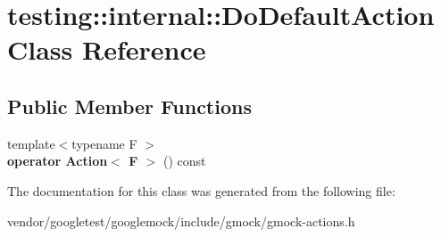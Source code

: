 \hypertarget{classtesting_1_1internal_1_1DoDefaultAction}{}\section{testing\+:\+:internal\+:\+:Do\+Default\+Action Class Reference}
\label{classtesting_1_1internal_1_1DoDefaultAction}
\subsection*{Public Member Functions}
\begin{DoxyCompactItemize}
\item 
{\footnotesize template$<$typename F $>$ }\\{\bfseries operator Action$<$ F $>$} () const \hypertarget{classtesting_1_1internal_1_1DoDefaultAction_a3f49c529814b98a1a7037793115fbb49}{}\label{classtesting_1_1internal_1_1DoDefaultAction_a3f49c529814b98a1a7037793115fbb49}

\end{DoxyCompactItemize}


The documentation for this class was generated from the following file\+:\begin{DoxyCompactItemize}
\item 
vendor/googletest/googlemock/include/gmock/gmock-\/actions.\+h\end{DoxyCompactItemize}
